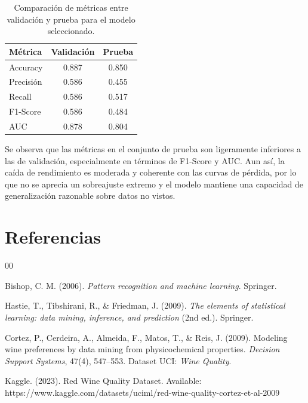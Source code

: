 \documentclass[conference]{IEEEtran}
\begin{document}
\begin{table}[ht]
    \centering
    \caption{Comparación de métricas entre validación y prueba para el modelo
    seleccionado.}
    \label{tab:best-val-test}
    \begin{tabular}{lcc}
        \hline
        Métrica & Validación & Prueba \\
        \hline
        Accuracy   & 0.887 & 0.850 \\
        Precisión  & 0.586 & 0.455 \\
        Recall     & 0.586 & 0.517 \\
        F1-Score   & 0.586 & 0.484 \\
        AUC        & 0.878 & 0.804 \\
        \hline
    \end{tabular}
\end{table}

Se observa que las métricas en el conjunto de prueba son ligeramente inferiores
a las de validación, especialmente en términos de F1-Score y AUC. Aun así, la
caída de rendimiento es moderada y coherente con las curvas de pérdida, por lo
que no se aprecia un sobreajuste extremo y el modelo mantiene una capacidad de
generalización razonable sobre datos no vistos.

\section{Referencias}

\begin{thebibliography}{00}

 Bishop, C. M. (2006). \textit{Pattern recognition and machine learning}. Springer.

 Hastie, T., Tibshirani, R., \& Friedman, J. (2009). \textit{The elements of statistical learning: data mining, inference, and prediction} (2nd ed.). Springer.

 Cortez, P., Cerdeira, A., Almeida, F., Matos, T., \& Reis, J. (2009). Modeling wine preferences by data mining from physicochemical properties. \textit{Decision Support Systems}, 47(4), 547--553. Dataset UCI: \textit{Wine Quality}.

 Kaggle. (2023). Red Wine Quality Dataset. Available: https://www.kaggle.com/datasets/uciml/red-wine-quality-cortez-et-al-2009

\end{thebibliography}
\end{document}
